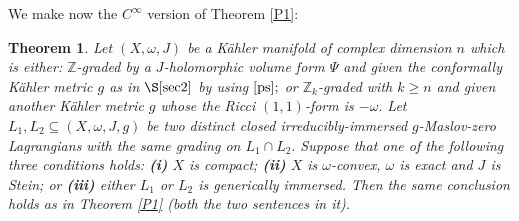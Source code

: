 \documentclass{article}
\theoremstyle{plain}%
\newtheorem{thm}{Theorem}[section]
\theoremstyle{definition}
\numberwithin{equation}{section}
\numberwithin{figure}{section}
\def\eq{\eqref}
\def\l{\label}
\def\ge{\geqslant}
\def\Z{{\mathbin{\mathbb Z}}}
\def\om{\omega}
\def\Ps{\Psi}
\def\iy{\infty}
\def\sb{\subseteq}
\begin{document}
We make now the $C^\iy$ version of Theorem \ref{P1}:
\begin{thm}\l{3.1}
Let $(X,\om,J)$ be a K\"ahler manifold of complex dimension $n$
which is either: $\Z$-graded by a $J$-holomorphic volume form $\Ps$ and given the conformally K\"ahler metric $g$ as in $\S\ref{sec2}$ by using $\eq{ps};$
or $\Z_k$-graded with $k\ge n$ and given another K\"ahler metric $g$
whose the Ricci $(1,1)$-form is $-\om.$ 
Let $L_1,L_2\sb (X,\om,J,g)$ be two distinct closed irreducibly-immersed $g$-Maslov-zero Lagrangians with the same grading on $L_1\cap L_2.$
Suppose that one of the following three conditions holds: {\bf(i)} $X$ is compact;  {\bf(ii)} $X$ is $\om$-convex, $\om$ is exact and $J$ is Stein; or
{\bf(iii)} either $L_1$ or $L_2$ is generically immersed.
Then the same conclusion holds as in Theorem \ref{P1} (both the two sentences in it).
\end{thm}
\end{document}
